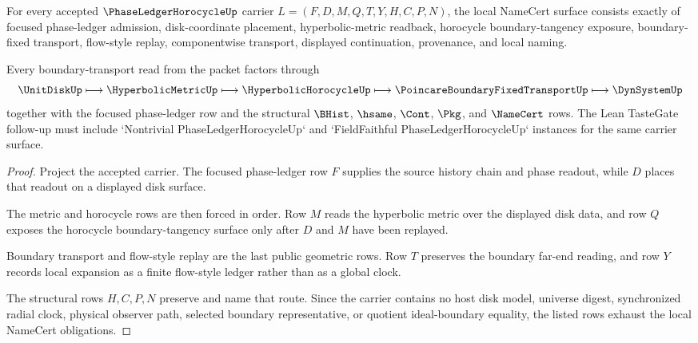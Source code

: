 \begin{theorem}
\label{thm:phase-ledger-horocycle-namecert-obligations}
For every accepted $\PhaseLedgerHorocycleUp$ carrier $L=(F,D,M,Q,T,Y,H,C,P,N)$, the local NameCert surface consists exactly of focused phase-ledger admission, disk-coordinate placement, hyperbolic-metric readback, horocycle boundary-tangency exposure, boundary-fixed transport, flow-style replay, componentwise transport, displayed continuation, provenance, and local naming.

Every boundary-transport read from the packet factors through
$$
\UnitDiskUp \longmapsto \HyperbolicMetricUp \longmapsto \HyperbolicHorocycleUp \longmapsto \PoincareBoundaryFixedTransportUp \longmapsto \DynSystemUp
$$
together with the focused phase-ledger row and the structural $\BHist$, $\hsame$, $\Cont$, $\Pkg$, and $\NameCert$ rows. The Lean TasteGate follow-up must include `Nontrivial PhaseLedgerHorocycleUp` and `FieldFaithful PhaseLedgerHorocycleUp` instances for the same carrier surface.
\end{theorem}
\begin{proof}
Project the accepted carrier. The focused phase-ledger row $F$ supplies the source history chain and phase readout, while $D$ places that readout on a displayed disk surface.

The metric and horocycle rows are then forced in order. Row $M$ reads the hyperbolic metric over the displayed disk data, and row $Q$ exposes the horocycle boundary-tangency surface only after $D$ and $M$ have been replayed.

Boundary transport and flow-style replay are the last public geometric rows. Row $T$ preserves the boundary far-end reading, and row $Y$ records local expansion as a finite flow-style ledger rather than as a global clock.

The structural rows $H,C,P,N$ preserve and name that route. Since the carrier contains no host disk model, universe digest, synchronized radial clock, physical observer path, selected boundary representative, or quotient ideal-boundary equality, the listed rows exhaust the local NameCert obligations.
\end{proof}



